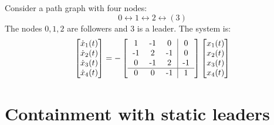 \begin{description}
        \begin{example}
            Consider a path graph with four nodes:
            \[ 0 \leftrightarrow 1 \leftrightarrow 2 \leftrightarrow (3) \]
            The nodes $0, 1, 2$ are followers and $3$ is a leader. The system is:
            \[
                \begin{bmatrix}
                    \dot{x}_1(t) \\ \dot{x}_2(t) \\ \dot{x}_3(t) \\ \dot{x}_4(t)
                \end{bmatrix} = 
                - \begin{bmatrix}
                    \begin{tabular}{ccc|c}
                        1   & -1    & 0     & 0     \\
                        -1  & 2     & -1    & 0     \\
                        0   & -1    & 2    & -1    \\
                        \hline
                        0   & 0     & -1    & 1     \\
                    \end{tabular}
                \end{bmatrix}
                \begin{bmatrix}
                    x_1(t) \\ x_2(t) \\ x_3(t) \\ x_4(t)
                \end{bmatrix}
            \]
    \end{example}

\end{description}



\section{Containment with static leaders}

